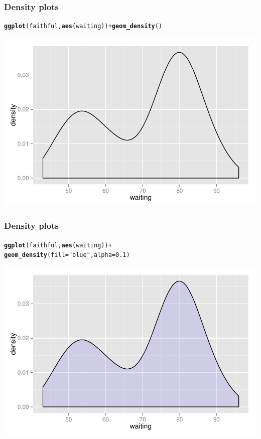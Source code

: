 \documentclass{beamer}\usepackage[]{graphicx}\usepackage[]{color}
\makeatletter
\newcommand{\hlnum}[1]{\textcolor[rgb]{0.686,0.059,0.569}{#1}}%
\newcommand{\hlstr}[1]{\textcolor[rgb]{0.192,0.494,0.8}{#1}}%
\newcommand{\hlopt}[1]{\textcolor[rgb]{0,0,0}{#1}}%
\newcommand{\hlstd}[1]{\textcolor[rgb]{0.345,0.345,0.345}{#1}}%
\newcommand{\hlkwc}[1]{\textcolor[rgb]{0.333,0.667,0.333}{#1}}%
\newcommand{\hlkwd}[1]{\textcolor[rgb]{0.737,0.353,0.396}{\textbf{#1}}}%
\newenvironment{kframe}{%
 \def\at@end@of@kframe{}%
 \ifinner\ifhmode%
  \def\at@end@of@kframe{\end{minipage}}%
  \begin{minipage}{\columnwidth}%
 \fi\fi%
 \def\FrameCommand##1{\hskip\@totalleftmargin \hskip-\fboxsep
 \colorbox{shadecolor}{##1}\hskip-\fboxsep
     \hskip-\linewidth \hskip-\@totalleftmargin \hskip\columnwidth}%
 \MakeFramed {\advance\hsize-\width
   \@totalleftmargin\z@ \linewidth\hsize
   \@setminipage}}%
 {\par\unskip\endMakeFramed%
 \at@end@of@kframe}
\newenvironment{knitrout}{}{} %
\makeatother
\begin{document}
\begin{frame}[fragile]
\frametitle{Density plots}
\begin{knitrout}\footnotesize
{}\color{fgcolor}\begin{kframe}
\begin{alltt}
\hlkwd{ggplot}\hlstd{(faithful,} \hlkwd{aes}\hlstd{(waiting))} \hlopt{+} \hlkwd{geom_density}\hlstd{()}
\end{alltt}
\end{kframe}

{\centering \includegraphics[width=.75\linewidth]{figure/densityone_} 

}



\end{knitrout}
\end{frame}


\begin{frame}[fragile]
\frametitle{Density plots}
\begin{knitrout}\footnotesize
{}\color{fgcolor}\begin{kframe}
\begin{alltt}
\hlkwd{ggplot}\hlstd{(faithful,} \hlkwd{aes}\hlstd{(waiting))} \hlopt{+}
\hlkwd{geom_density}\hlstd{(}\hlkwc{fill} \hlstd{=} \hlstr{"blue"}\hlstd{,} \hlkwc{alpha} \hlstd{=} \hlnum{0.1}\hlstd{)}
\end{alltt}
\end{kframe}

{\centering \includegraphics[width=.75\linewidth]{figure/densityonefove_} 

}



\end{knitrout}
\end{frame}
\end{document}
